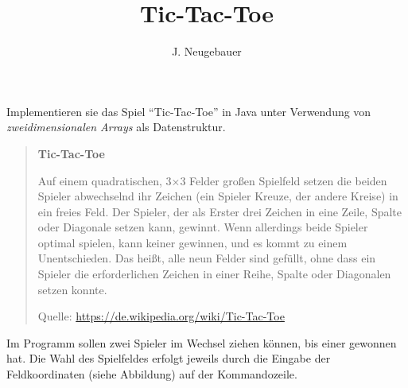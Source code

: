 \documentclass[10pt, a4paper]{scrartcl}
\author{J. Neugebauer}
\title{Tic-Tac-Toe}
\date{\Heute}
\begin{document}
\ReiheTitel

Implementieren sie das Spiel \enquote{Tic-Tac-Toe} in Java unter Verwendung von \emph{zweidimensionalen Arrays} als Datenstruktur.

\bigskip
\begin{minipage}{\textwidth-4cm}
\begin{quote}
\textbf{Tic-Tac-Toe}

Auf einem quadratischen, 3×3 Felder großen Spielfeld setzen die beiden Spieler abwechselnd ihr Zeichen (ein Spieler Kreuze, der andere Kreise) in ein freies Feld. Der Spieler, der als Erster drei Zeichen in eine Zeile, Spalte oder Diagonale setzen kann, gewinnt. Wenn allerdings beide Spieler optimal spielen, kann keiner gewinnen, und es kommt zu einem Unentschieden. Das heißt, alle neun Felder sind gefüllt, ohne dass ein Spieler die erforderlichen Zeichen in einer Reihe, Spalte oder Diagonalen setzen konnte.

\begin{flushright}\footnotesize
Quelle: \href{https://de.wikipedia.org/wiki/Tic-Tac-Toe}{https://de.wikipedia.org/wiki/Tic-Tac-Toe}
\end{flushright}
\end{quote}
\end{minipage}\hfill\begin{minipage}{4cm}
\end{minipage}

\bigskip
Im Programm sollen zwei Spieler im Wechsel ziehen können, bis einer gewonnen hat. Die Wahl des Spielfeldes erfolgt jeweils durch die Eingabe der Feldkoordinaten (siehe Abbildung) auf der Kommandozeile.
\begin{center}
\end{center}
\end{document}
